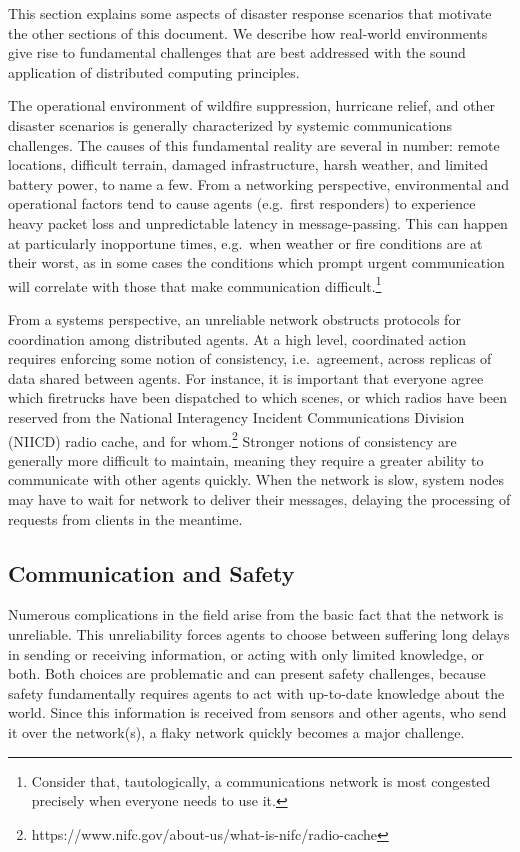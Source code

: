 \documentclass[]             %
{NASA}                       %
\theoremstyle{definition}
\begin{document}
\label{sec:disaster-response}

This section explains some aspects of disaster response scenarios that
motivate the other sections of this document. We describe how real-world
environments give rise to fundamental challenges that are best addressed
with the sound application of distributed computing principles.

The operational environment of wildfire suppression, hurricane relief,
and other disaster scenarios is generally characterized by systemic
communications challenges. The causes of this fundamental reality are
several in number: remote locations, difficult terrain, damaged
infrastructure, harsh weather, and limited battery power, to name a few.
From a networking perspective, environmental and operational factors
tend to cause agents (e.g.~first responders) to experience heavy packet
loss and unpredictable latency in message-passing. This can happen at
particularly inopportune times, e.g.~when weather or fire conditions are
at their worst, as in some cases the conditions which prompt urgent
communication will correlate with those that make communication
difficult.\footnote{Consider that, tautologically, a communications
  network is most \mbox{congested} precisely when everyone needs to use
  it.}

From a systems perspective, an unreliable network obstructs protocols
for coordination among distributed agents. At a high level, coordinated
action requires enforcing some notion of consistency, i.e.~agreement,
across replicas of data shared between agents. For instance, it is
important that everyone agree which firetrucks have been dispatched to
which scenes, or which radios have been reserved from the National
Interagency Incident Communications Division (NIICD) radio cache, and
for whom.\footnote{https://www.nifc.gov/about-us/what-is-nifc/radio-cache}
Stronger notions of consistency are generally more difficult to
maintain, meaning they require a greater ability to communicate with
other agents quickly. When the network is slow, system nodes may have to
wait for network to deliver their messages, delaying the processing of
requests from clients in the meantime.

\hypertarget{communication-and-safety}{%
\subsection{Communication and Safety}\label{communication-and-safety}}

Numerous complications in the field arise from the basic fact that the
network is unreliable. This unreliability forces agents to choose
between suffering long delays in sending or receiving information, or
acting with only limited knowledge, or both. Both choices are
problematic and can present safety challenges, because safety
fundamentally requires agents to act with up-to-date knowledge about the
world. Since this information is received from sensors and other agents,
who send it over the network(s), a flaky network quickly becomes a major
challenge.
\end{document}

